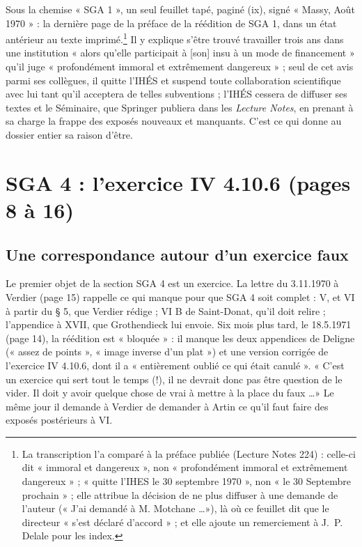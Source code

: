 \documentclass[11pt,a4paper]{article}
\begin{document}
Sous la chemise « SGA 1 », un seul feuillet tapé, paginé (ix), signé « Massy,
Août 1970 » : la dernière page de la préface de la réédition de SGA 1, dans
un état antérieur au texte imprimé.\footnote{La transcription l'a comparé à
la préface publiée (Lecture Notes 224) : celle-ci dit « immoral et
dangereux », non « profondément immoral et extrêmement dangereux » ; « quitte
l'IHES le 30 septembre 1970 », non « le 30 Septembre prochain » ; elle
attribue la décision de ne plus diffuser à une demande de l'auteur
(« J'ai demandé à M. Motchane \ldots »), là où ce feuillet dit que le
directeur « s'est déclaré d'accord » ; et elle ajoute un remerciement à
J.~P. Delale pour les index.}
Il y explique s'être trouvé travailler trois ans dans une institution « alors
qu'elle participait à [son] insu à un mode de financement » qu'il juge
« profondément immoral et extrêmement dangereux » ; seul de cet avis parmi
ses collègues, il quitte l'IHÉS et suspend toute collaboration scientifique
avec lui tant qu'il acceptera de telles subventions ; l'IHÉS cessera de
diffuser ses textes et le Séminaire, que Springer publiera dans les
\emph{Lecture Notes}, en prenant à sa charge la frappe des exposés nouveaux
et manquants. C'est ce qui donne au dossier entier sa raison d'être.

\section*{SGA 4 : l'exercice IV 4.10.6 (pages 8 à 16)}

\subsection*{Une correspondance autour d'un exercice faux}

Le premier objet de la section SGA 4 est un exercice. La lettre du 3.11.1970
à Verdier (page 15) rappelle ce qui manque pour que SGA 4 soit complet : V, et
VI à partir du § 5, que Verdier rédige ; VI B de Saint-Donat, qu'il doit
relire ; l'appendice à XVII, que Grothendieck lui envoie. Six mois plus tard,
le 18.5.1971 (page 14), la réédition est « bloquée » : il manque les deux
appendices de Deligne (« assez de points », « image inverse d'un plat ») et
une version corrigée de l'exercice IV 4.10.6, dont il a « entièrement
oublié ce qui était canulé ». « C'est un exercice qui sert tout le temps
(!), il ne devrait donc pas être question de le vider. Il doit y avoir
quelque chose de vrai à mettre à la place du faux \ldots » Le même jour il
demande à Verdier de demander à Artin ce qu'il faut faire des exposés
postérieurs à VI.
\end{document}
